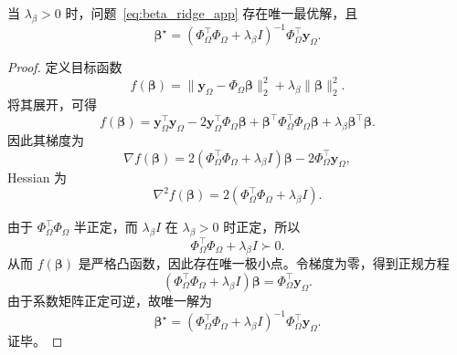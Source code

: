 \begin{proposition}
\label{prop:beta_unique_app}
当 $\lambda_\beta>0$ 时，问题~\eqref{eq:beta_ridge_app} 存在唯一最优解，且
\begin{equation}
\boldsymbol\beta^\star
=
\left(\Phi_\Omega^\top \Phi_\Omega+\lambda_\beta I\right)^{-1}
\Phi_\Omega^\top \mathbf y_\Omega.
\label{eq:beta_closed_form_app}
\end{equation}
\end{proposition}

\begin{proof}
定义目标函数
\begin{equation}
f(\boldsymbol\beta)
=
\|\mathbf y_\Omega - \Phi_\Omega \boldsymbol\beta\|_2^2
+
\lambda_\beta \|\boldsymbol\beta\|_2^2.
\end{equation}
将其展开，可得
\begin{equation}
f(\boldsymbol\beta)
=
\mathbf y_\Omega^\top \mathbf y_\Omega
-2\mathbf y_\Omega^\top \Phi_\Omega \boldsymbol\beta
+\boldsymbol\beta^\top \Phi_\Omega^\top \Phi_\Omega \boldsymbol\beta
+\lambda_\beta \boldsymbol\beta^\top \boldsymbol\beta.
\end{equation}
因此其梯度为
\begin{equation}
\nabla f(\boldsymbol\beta)
=
2\left(\Phi_\Omega^\top \Phi_\Omega+\lambda_\beta I\right)\boldsymbol\beta
-
2\Phi_\Omega^\top \mathbf y_\Omega,
\end{equation}
Hessian 为
\begin{equation}
\nabla^2 f(\boldsymbol\beta)
=
2\left(\Phi_\Omega^\top \Phi_\Omega+\lambda_\beta I\right).
\end{equation}

由于 $\Phi_\Omega^\top \Phi_\Omega$ 半正定，而 $\lambda_\beta I$ 在 $\lambda_\beta>0$ 时正定，所以
\begin{equation}
\Phi_\Omega^\top \Phi_\Omega+\lambda_\beta I
\succ 0.
\end{equation}
从而 $f(\boldsymbol\beta)$ 是严格凸函数，因此存在唯一极小点。令梯度为零，得到正规方程
\begin{equation}
\left(\Phi_\Omega^\top \Phi_\Omega+\lambda_\beta I\right)\boldsymbol\beta
=
\Phi_\Omega^\top \mathbf y_\Omega.
\end{equation}
由于系数矩阵正定可逆，故唯一解为
\begin{equation}
\boldsymbol\beta^\star
=
\left(\Phi_\Omega^\top \Phi_\Omega+\lambda_\beta I\right)^{-1}
\Phi_\Omega^\top \mathbf y_\Omega.
\end{equation}
证毕。
\end{proof}


